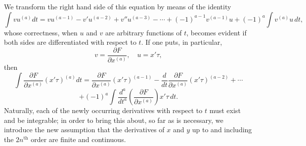\documentclass[11pt,a4paper,leqno]{article}
\begin{document}
We transform the right hand side of this equation by means of the identity
\[
\int vu^{(a)}dt=vu^{(a-1)}-v'u^{(a-2)}+v''u^{(a-3)}-\cdots
+(-1)^{a-1}v^{(a-1)}u+(-1)^a\int v^{(a)}u\,dt,
\]
whose correctness, when $u$ and $v$ are arbitrary functions of $t$, becomes evident if both sides are differentiated with respect to $t$. If one puts, in particular,
\[
v=\frac{\partial F}{\partial x^{(a)}},\quad u=x'\tau,
\]
then
\[
\int\frac{\partial F}{\partial x^{(a)}}(x'\tau)^{(a)}dt
=\frac{\partial F}{\partial x^{(a)}}(x'\tau)^{(a-1)}
-\frac{d}{dt}\frac{\partial F}{\partial x^{(a)}}(x'\tau)^{(a-2)}+\cdots
\]
\[
+(-1)^a\int\frac{d^a}{dt^a}\left(\frac{\partial F}{\partial x^{(a)}}\right)x'\tau\,dt.
\]
Naturally, each of the newly occurring derivatives with respect to $t$ must exist and be integrable; in order to bring this about, so far as is necessary, we introduce the new assumption that the derivatives of $x$ and $y$ up to and including the $2n^{\mathrm{th}}$ order are finite and continuous.
\end{document}
